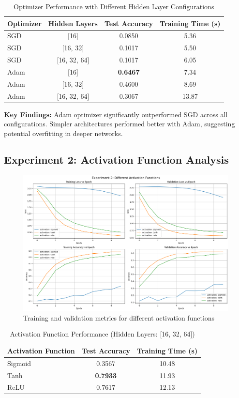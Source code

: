 \documentclass[11pt,a4paper]{article}
\begin{document}
\begin{table}[H]
\centering
\caption{Optimizer Performance with Different Hidden Layer Configurations}
\begin{tabular}{@{}lccc@{}}
\toprule
\textbf{Optimizer} & \textbf{Hidden Layers} & \textbf{Test Accuracy} & \textbf{Training Time (s)} \\
\midrule
SGD & [16] & 0.0850 & 5.36 \\
SGD & [16, 32] & 0.1017 & 5.50 \\
SGD & [16, 32, 64] & 0.1017 & 6.05 \\
\midrule
Adam & [16] & \textbf{0.6467} & 7.34 \\
Adam & [16, 32] & 0.4600 & 8.69 \\
Adam & [16, 32, 64] & 0.3067 & 13.87 \\
\bottomrule
\end{tabular}
\end{table}

\textbf{Key Findings:} Adam optimizer significantly outperformed SGD across all configurations. Simpler architectures performed better with Adam, suggesting potential overfitting in deeper networks.

\subsection{Experiment 2: Activation Function Analysis}
\begin{figure}[H]
\centering
\includegraphics[width=\textwidth]{e2.png}
\caption{Training and validation metrics for different activation functions}
\label{fig:experiment2}
\end{figure}

\begin{table}[H]
\centering
\caption{Activation Function Performance (Hidden Layers: [16, 32, 64])}
\begin{tabular}{@{}lcc@{}}
\toprule
\textbf{Activation Function} & \textbf{Test Accuracy} & \textbf{Training Time (s)} \\
\midrule
Sigmoid & 0.3567 & 10.48 \\
Tanh & \textbf{0.7933} & 11.93 \\
ReLU & 0.7617 & 12.13 \\
\bottomrule
\end{tabular}
\end{table}
\end{document}
